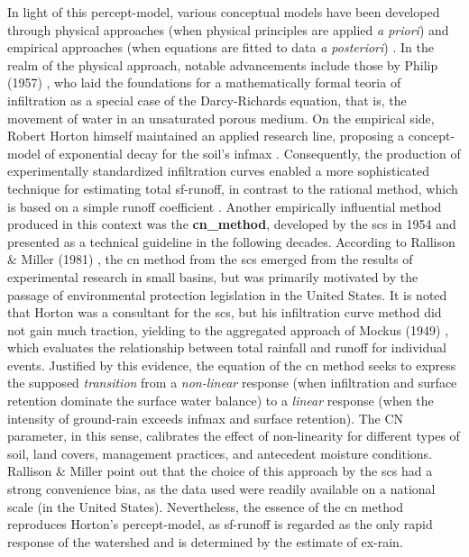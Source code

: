 \documentclass[./main_en.tex]{subfiles}
\begin{document}
\par In light of this \gls{percept-model}, various conceptual models have been developed through physical approaches (when physical principles are applied \textit{a priori}) and empirical approaches (when equations are fitted to data \textit{a posteriori}) \cite{mishra2003}. In the realm of the physical approach, notable advancements include those by Philip (1957) \cite{philip1957}, who laid the foundations for a mathematically formal \gls{teoria} of infiltration as a special case of the Darcy-Richards equation, that is, the movement of water in an unsaturated porous medium. On the empirical side, Robert Horton himself maintained an applied research line, proposing a \gls{concept-model} of exponential decay for the soil’s \gls{infmax} \cite{Horton1939}. Consequently, the production of experimentally standardized infiltration curves enabled a more sophisticated technique for estimating total \gls{sf-runoff}, in contrast to the rational method, which is based on a simple runoff coefficient \cite{Cook1946}. Another empirically influential method produced in this context was the \textbf{\gls{cn_method}}, developed by the \acrfull{scs} in 1954 and presented as a technical guideline in the following decades. According to Rallison \& Miller (1981) \cite{Rallison1981}, the \acrshort{cn} method from the \acrshort{scs} emerged from the results of experimental research in small basins, but was primarily motivated by the passage of environmental protection legislation in the United States. It is noted that Horton was a consultant for the \acrshort{scs}, but his infiltration curve method did not gain much traction, yielding to the aggregated approach of Mockus (1949) \cite{mockus1949}, which evaluates the relationship between total rainfall and runoff for individual events. Justified by this evidence, the equation of the \acrshort{cn} method seeks to express the supposed \textit{transition} from a \textit{non-linear} response (when infiltration and surface retention dominate the surface water balance) to a \textit{linear} response (when the intensity of \gls{ground-rain} exceeds \gls{infmax} and surface retention). The CN parameter, in this sense, calibrates the effect of non-linearity for different types of soil, land covers, management practices, and antecedent moisture conditions. Rallison \& Miller point out that the choice of this approach by the \acrshort{scs} had a strong convenience bias, as the data used were readily available on a national scale (in the United States). Nevertheless, the essence of the \acrshort{cn} method reproduces Horton’s \gls{percept-model}, as \gls{sf-runoff} is regarded as the only rapid response of the watershed and is determined by the estimate of \gls{ex-rain}.
\end{document}
